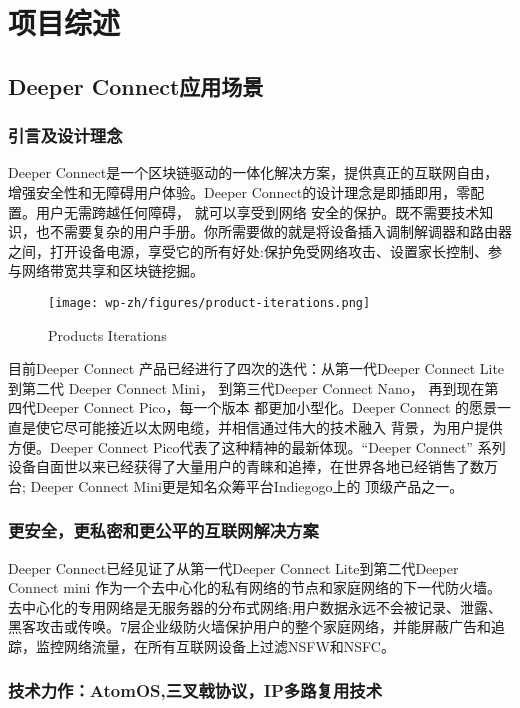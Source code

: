 \documentclass[a4paper]{article}
\begin{document}
\newpage
\section{项目综述}

\subsection{Deeper Connect应用场景}
\subsubsection{引言及设计理念}
Deeper Connect是一个区块链驱动的一体化解决方案，提供真正的互联网自由，增强安全性和无障碍用户体验。Deeper Connect的设计理念是即插即用，零配置。用户无需跨越任何障碍， 就可以享受到网络 安全的保护。既不需要技术知识，也不需要复杂的用户手册。你所需要做的就是将设备插入调制解调器和路由器之间，打开设备电源，享受它的所有好处:保护免受网络攻击、设置家长控制、参与网络带宽共享和区块链挖掘。

\begin{figure}[hhhh]
\centering
\texttt{[image: wp-zh/figures/product-iterations.png]}
\caption{Products Iterations}
\label{fig:产品代系}
\end{figure}

\noindent 目前Deeper Connect 产品已经进行了四次的迭代：从第一代Deeper Connect Lite到第二代 Deeper Connect Mini， 到第三代Deeper Connect Nano， 再到现在第四代Deeper Connect Pico，每一个版本 都更加小型化。Deeper Connect 的愿景一直是使它尽可能接近以太网电缆，并相信通过伟大的技术融入 背景，为用户提供方便。Deeper Connect Pico代表了这种精神的最新体现。“Deeper Connect” 系列设备自面世以来已经获得了大量用户的青睐和追捧，在世界各地已经销售了数万台;  Deeper Connect Mini更是知名众筹平台Indiegogo上的 顶级产品之一。

\subsubsection{更安全，更私密和更公平的互联网解决方案}
Deeper Connect已经见证了从第一代Deeper Connect Lite到第二代Deeper Connect mini 作为一个去中心化的私有网络的节点和家庭网络的下一代防火墙。去中心化的专用网络是无服务器的分布式网络;用户数据永远不会被记录、泄露、黑客攻击或传唤。7层企业级防火墙保护用户的整个家庭网络，并能屏蔽广告和追踪，监控网络流量，在所有互联网设备上过滤NSFW和NSFC。

\subsubsection{技术力作：AtomOS,三叉戟协议，IP多路复用技术}
\end{document}

